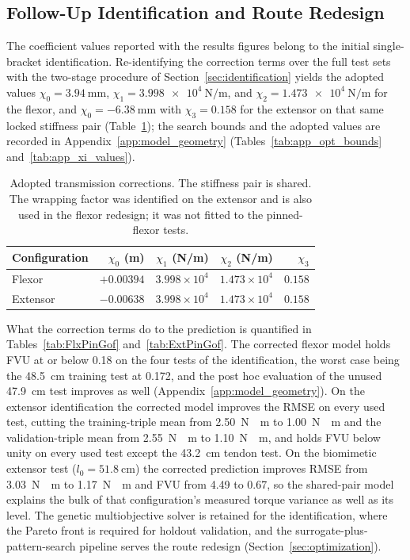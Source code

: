 \subsection{Follow-Up Identification and Route Redesign}\label{sec:ongoing}

The coefficient values reported with the results figures belong to the initial single-bracket identification. Re-identifying the correction terms over the full test sets with the two-stage procedure of Section~\ref{sec:identification} yields the adopted values $\chi_{0} = \qty{+3.94}{\mm}$, $\chi_{1} = \qty{3.998e4}{\N\per\m}$, and $\chi_{2} = \qty{1.473e4}{\N\per\m}$ for the flexor, and $\chi_{0} = \qty{-6.38}{\mm}$ with $\chi_{3} = 0.158$ for the extensor on that same locked stiffness pair (Table~\ref{tab:AdoptedXi}); the search bounds and the adopted values are recorded in Appendix~\ref{app:model_geometry} (Tables~\ref{tab:app_opt_bounds} and~\ref{tab:app_xi_values}).

\begin{table}[htbp]
\centering\small
\caption{Adopted transmission corrections. The stiffness pair is shared. The wrapping factor was identified on the extensor and is also used in the flexor redesign; it was not fitted to the pinned-flexor tests.}
\label{tab:AdoptedXi}
\begin{tabular}{@{}lrrrr@{}}
\toprule
Configuration & $\chi_{0}$ (m) & $\chi_{1}$ (N/m) & $\chi_{2}$ (N/m) & $\chi_{3}$\\
\midrule
Flexor & $+0.00394$ & $3.998\times10^{4}$ & $1.473\times10^{4}$ & $0.158$\\
Extensor & $-0.00638$ & $3.998\times10^{4}$ & $1.473\times10^{4}$ & $0.158$\\
\bottomrule
\end{tabular}
\end{table} What the correction terms do to the prediction is quantified in Tables~\ref{tab:FlxPinGof} and~\ref{tab:ExtPinGof}. The corrected flexor model holds FVU at or below 0.18 on the four tests of the identification, the worst case being the \qty{48.5}{\cm} training test at 0.172, and the post hoc evaluation of the unused \qty{47.9}{\cm} test improves as well (Appendix~\ref{app:model_geometry}). On the extensor identification the corrected model improves the RMSE on every used test, cutting the training-triple mean from \qty{2.50}{\newton\cdot\meter} to \qty{1.00}{\newton\cdot\meter} and the validation-triple mean from \qty{2.55}{\newton\cdot\meter} to \qty{1.10}{\newton\cdot\meter}, and holds FVU below unity on every used test except the \qty{43.2}{\cm} tendon test. On the biomimetic extensor test ($l_{0} = \qty{51.8}{\cm}$) the corrected prediction improves RMSE from \qty{3.03}{\newton\cdot\meter} to \qty{1.17}{\newton\cdot\meter} and FVU from 4.49 to 0.67, so the shared-pair model explains the bulk of that configuration's measured torque variance as well as its level. The genetic multiobjective solver is retained for the identification, where the Pareto front is required for holdout validation, and the surrogate-plus-pattern-search pipeline serves the route redesign (Section~\ref{sec:optimization}).

